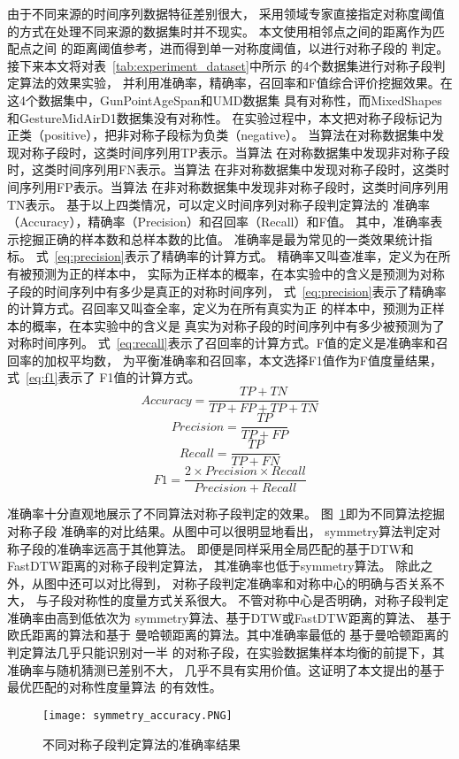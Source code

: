 由于不同来源的时间序列数据特征差别很大，
采用领域专家直接指定对称度阈值的方式在处理不同来源的数据集时并不现实。
本文使用相邻点之间的距离作为匹配点之间
的距离阈值参考，进而得到单一对称度阈值，以进行对称子段的
判定。接下来本文将对表~\ref{tab:experiment_dataset}中所示
的4个数据集进行对称子段判定算法的效果实验，
并利用准确率，精确率，召回率和F值综合评价挖掘效果。在这4个数据集中，GunPointAgeSpan和UMD数据集
具有对称性，而MixedShapes和GestureMidAirD1数据集没有对称性。
在实验过程中，本文把对称子段标记为正类（positive），把非对称子段标为负类（negative）。
当算法在对称数据集中发现对称子段时，这类时间序列用TP表示。当算法
在对称数据集中发现非对称子段时，这类时间序列用FN表示。当算法
在非对称数据集中发现对称子段时，这类时间序列用FP表示。当算法
在非对称数据集中发现非对称子段时，这类时间序列用TN表示。
基于以上四类情况，可以定义时间序列对称子段判定算法的
准确率（Accuracy），精确率（Precision）和召回率（Recall）和F值。
其中，准确率表示挖掘正确的样本数和总样本数的比值。
准确率是最为常见的一类效果统计指标。
式~\ref{eq:precision}表示了精确率的计算方式。
精确率又叫查准率，定义为在所有被预测为正的样本中，
实际为正样本的概率，在本实验中的含义是预测为对称子段的时间序列中有多少是真正的对称时间序列，
式~\ref{eq:precision}表示了精确率的计算方式。召回率又叫查全率，定义为在所有真实为正
的样本中，预测为正样本的概率，在本实验中的含义是
真实为对称子段的时间序列中有多少被预测为了对称时间序列。
式~\ref{eq:recall}表示了召回率的计算方式。F值的定义是准确率和召回率的加权平均数，
为平衡准确率和召回率，本文选择F1值作为F值度量结果，式~\ref{eq:f1}表示了
F1值的计算方式。
\begin{equation}
  Accuracy=\frac{TP+TN}{TP+FP+TP+TN}
  \label{eq:Accuracy}
\end{equation}
\begin{equation}
  Precision=\frac{TP}{TP+FP}
  \label{eq:precision}
\end{equation}
\begin{equation}
  Recall=\frac{TP}{TP+FN}
  \label{eq:recall}
\end{equation}
\begin{equation}
  F1=\frac{2 \times Precision \times Recall}{Precision+Recall}
  \label{eq:f1}
\end{equation}

准确率十分直观地展示了不同算法对称子段判定的效果。
图~\ref{fig:accuracy_compare}即为不同算法挖掘对称子段
准确率的对比结果。从图中可以很明显地看出，
symmetry算法判定对称子段的准确率远高于其他算法。
即便是同样采用全局匹配的基于DTW和FastDTW距离的对称子段判定算法，
其准确率也低于symmetry算法。
除此之外，从图中还可以对比得到，
对称子段判定准确率和对称中心的明确与否关系不大，
与子段对称性的度量方式关系很大。
不管对称中心是否明确，对称子段判定准确率由高到低依次为
symmetry算法、基于DTW或FastDTW距离的算法、
基于欧氏距离的算法和基于
曼哈顿距离的算法。其中准确率最低的
基于曼哈顿距离的判定算法几乎只能识别对一半
的对称子段，在实验数据集样本均衡的前提下，其准确率与随机猜测已差别不大，
几乎不具有实用价值。这证明了本文提出的基于最优匹配的对称性度量算法
的有效性。
\begin{figure}
  \centering
  \texttt{[image: symmetry\_accuracy.PNG]}
  \caption{不同对称子段判定算法的准确率结果}
  \label{fig:accuracy_compare}
\end{figure}

